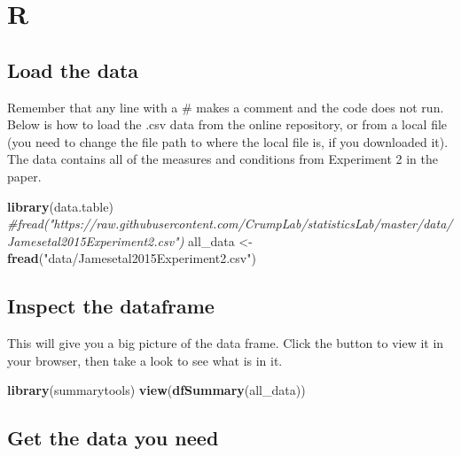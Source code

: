 \documentclass[
]{book}
\newenvironment{Shaded}{\begin{snugshade}}{\end{snugshade}}
\newcommand{\CommentTok}[1]{\textcolor[rgb]{0.56,0.35,0.01}{\textit{#1}}}
\newcommand{\FunctionTok}[1]{\textcolor[rgb]{0.13,0.29,0.53}{\textbf{#1}}}
\newcommand{\NormalTok}[1]{#1}
\newcommand{\OtherTok}[1]{\textcolor[rgb]{0.56,0.35,0.01}{#1}}
\newcommand{\StringTok}[1]{\textcolor[rgb]{0.31,0.60,0.02}{#1}}
\begin{document}
\hypertarget{r-8}{%
\section{R}\label{r-8}}

\hypertarget{load-the-data-2}{%
\subsection{Load the data}\label{load-the-data-2}}

Remember that any line with a \# makes a comment and the code does not run. Below is how to load the .csv data from the online repository, or from a local file (you need to change the file path to where the local file is, if you downloaded it). The data contains all of the measures and conditions from Experiment 2 in the paper.

\begin{Shaded}
\begin{Highlighting}[]
\FunctionTok{library}\NormalTok{(data.table)}
\CommentTok{\#fread("https://raw.githubusercontent.com/CrumpLab/statisticsLab/master/data/Jamesetal2015Experiment2.csv")}
\NormalTok{all\_data }\OtherTok{\textless{}{-}} \FunctionTok{fread}\NormalTok{(}\StringTok{"data/Jamesetal2015Experiment2.csv"}\NormalTok{)}
\end{Highlighting}
\end{Shaded}

\hypertarget{inspect-the-dataframe}{%
\subsection{Inspect the dataframe}\label{inspect-the-dataframe}}

This will give you a big picture of the data frame. Click the button to view it in your browser, then take a look to see what is in it.

\begin{Shaded}
\begin{Highlighting}[]
\FunctionTok{library}\NormalTok{(summarytools)}
\FunctionTok{view}\NormalTok{(}\FunctionTok{dfSummary}\NormalTok{(all\_data))}
\end{Highlighting}
\end{Shaded}

\hypertarget{get-the-data-you-need}{%
\subsection{Get the data you need}\label{get-the-data-you-need}}
\end{document}
